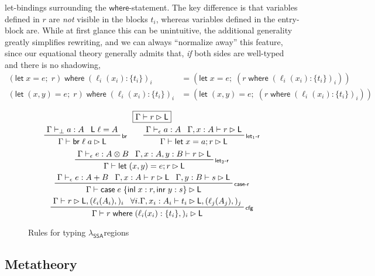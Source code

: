 \documentclass[acmsmall,screen,review]{acmart}
\newcommand{\ms}[1]{\ensuremath{\mathsf{#1}}}
\newcommand{\lto}{:}
\newcommand{\linl}[1]{\ms{inl}\;{#1}}
\newcommand{\linr}[1]{\ms{inr}\;{#1}}
\newcommand{\letexpr}[3]{\ensuremath{\ms{let}\;#1 = #2;\;#3}}
\newcommand{\letstmt}[3]{\ensuremath{\ms{let}\;#1 = #2; #3}}
\newcommand{\brb}[2]{\ms{br}\;#1\;#2}
\newcommand{\casestmt}[5]{\ms{case}\;#1\;\{\linl{#2} \lto #3, \linr{#4} \lto #5\}}
\newcommand{\where}[2]{#1\;\ms{where}\;#2}
\newcommand{\wbranch}[3]{#1(#2) \lto \{#3\}}
\newcommand{\bhyp}[2]{#1 : #2}
\newcommand{\lhyp}[2]{#1(#2)}
\newcommand{\rle}[1]{{\scriptsize\textsf{#1}}}
\newcommand{\hasty}[4]{#1 \vdash_{#2} #3: {#4}}
\newcommand{\haslb}[3]{#1 \vdash #2 \rhd #3}
\newcommand{\isotopessa}{\(\lambda_{\ms{SSA}}\)}
\begin{document}
let-bindings surrounding the \ms{where}-statement. The key difference is that
variables defined in $r$ are \emph{not} visible in the blocks $t_i$, whereas
variables defined in the entry-block are. While at first glance this can be
unintuitive, the additional generality greatly simplifies rewriting, and we can
always ``normalize away'' this feature, since our equational theory generally
admits that, \emph{if} both sides are well-typed and there is no shadowing,
\begin{align*}
  \where{(\letexpr{x}{e}{r})}{(\wbranch{\ell_i}{x_i}{t_i})_i}
  &= (\letexpr{x}{e}{(\where{r}{(\wbranch{\ell_i}{x_i}{t_i})_i})}) \\
  \where{(\letexpr{(x, y)}{e}{r})}{(\wbranch{\ell_i}{x_i}{t_i})_i}
  &= (\letexpr{(x, y)}{e}{(\where{r}{(\wbranch{\ell_i}{x_i}{t_i})_i})})
\end{align*}

\begin{figure}
  \begin{gather*}
    \boxed{\haslb{\Gamma}{r}{\ms{L}}} \\
    \prftree[r]{\rle{br}}{\hasty{\Gamma}{\bot}{a}{A}}{\ms{L}\;\ell = A}
      {\haslb{\Gamma}{\brb{\ell}{a}}{\ms{L}}} \qquad
    \prftree[r]{\rle{let$_1$-r}}
      {\hasty{\Gamma}{\epsilon}{a}{A}}
      {\haslb{\Gamma, \bhyp{x}{A}}{r}{\ms{L}}}
      {\haslb{\Gamma}{\letstmt{x}{a}{r}}{\ms{L}}} \\
    \prftree[r]{\rle{let$_2$-r}}
      {\hasty{\Gamma}{\epsilon}{e}{A \otimes B}}
      {\haslb{\Gamma, \bhyp{x}{A}, \bhyp{y}{B}}{r}{\ms{L}}}
      {\haslb{\Gamma}{\letstmt{(x, y)}{e}{r}}{\ms{L}}} \\
    \prftree[r]{\rle{case-r}}
      {\hasty{\Gamma}{\epsilon}{e}{A + B}}
      {\haslb{\Gamma, \bhyp{x}{A}}{r}{\ms{L}}}
      {\haslb{\Gamma, \bhyp{y}{B}}{s}{\ms{L}}}
      {\haslb{\Gamma}{\casestmt{e}{x}{r}{y}{s}}{\ms{L}}} \\
    \prftree[r]{\rle{cfg}}
      {\haslb{\Gamma}{r}{\ms{L}, (\lhyp{\ell_i}{A_i},)_i}}
      {\forall i. \haslb{\Gamma, \bhyp{x_i}{A_i}}{t_i}{\ms{L}, (\lhyp{\ell_j}{A_j},)_j}}
      {\haslb{\Gamma}{\where{r}{(\wbranch{\ell_i}{x_i}{t_i},)_i}}{\ms{L}}}
  \end{gather*}
  \caption{Rules for typing \isotopessa regions}
  \Description{}
  \label{fig:ssa-reg-rules}
\end{figure}

\subsection{Metatheory}
\end{document}
